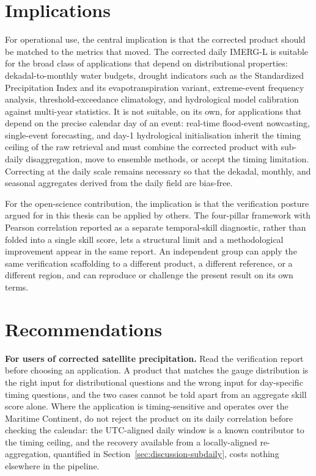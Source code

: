 \section{Implications}\label{sec:conclusion-implications}

For operational use, the central implication is that the
corrected product should be matched to the metrics that moved.
The corrected daily IMERG-L is suitable for the broad class of
applications that depend on distributional properties:
dekadal-to-monthly water budgets, drought indicators such as the
Standardized Precipitation Index and its evapotranspiration
variant, extreme-event frequency analysis, threshold-exceedance
climatology, and hydrological model calibration against multi-year
statistics. It is not suitable, on its own, for applications that
depend on the precise calendar day of an event: real-time
flood-event nowcasting, single-event forecasting, and day-1
hydrological initialisation inherit the timing ceiling of the raw
retrieval and must combine the corrected product with sub-daily
disaggregation, move to ensemble methods, or accept the timing
limitation. Correcting at the daily scale remains necessary so
that the dekadal, monthly, and seasonal aggregates derived from
the daily field are bias-free.

For the open-science contribution, the implication is that the
verification posture argued for in this thesis can be applied by
others. The four-pillar framework with Pearson correlation
reported as a separate temporal-skill diagnostic, rather than
folded into a single skill score, lets a structural limit and a
methodological improvement appear in the same report. An
independent group can apply the same verification scaffolding to
a different product, a different reference, or a different region,
and can reproduce or challenge the present result on its own
terms.


\section{Recommendations}\label{sec:conclusion-recommendations}

\medskip\noindent\textbf{For users of corrected satellite
precipitation.}
Read the verification report before choosing an application.
A product that matches the gauge distribution is the right input
for distributional questions and the wrong input for
day-specific timing questions, and the two cases cannot be told
apart from an aggregate skill score alone. Where the application
is timing-sensitive and operates over the Maritime Continent, do
not reject the product on its daily correlation before checking
the calendar: the UTC-aligned daily window is a known contributor
to the timing ceiling, and the recovery available from a
locally-aligned re-aggregation, quantified in
Section~\ref{sec:discussion-subdaily}, costs nothing elsewhere in
the pipeline.

